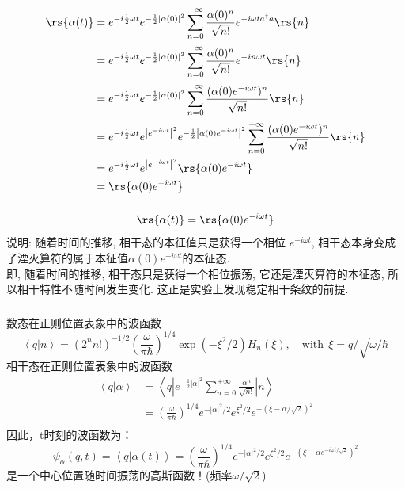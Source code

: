 \begin{frame}
    \frametitle{}
    \[ \begin{aligned}
        \rs{\alpha (t)} &= e^{-i\frac{1}{2} \omega t}  e^{-\frac{1}{2}\left|\alpha(0)\right|^2} \sum_{n=0} ^{+\infty}  \frac{\alpha(0)^n}{\sqrt{n!}} e^{-i \omega t  a^\dagger a}  \rs{n}  \\
        &= e^{-i\frac{1}{2} \omega t}  e^{-\frac{1}{2}\left|\alpha(0)\right|^2}\sum_{n=0} ^{+\infty}  \frac{\alpha(0)^n}{\sqrt{n!}} e^{-i n \omega t }  \rs{n}  \\ 
        &= e^{-i\frac{1}{2} \omega t}  e^{-\frac{1}{2}\left|\alpha(0)\right|^2} \sum_{n=0} ^{+\infty}  \frac{(\alpha(0) e^{-i \omega t })^n}{\sqrt{n!}} \rs{n}  \\ 
        &= e^{-i\frac{1}{2} \omega t} e^{\left|e^{-i \omega t }\right|^2}   e^{-\frac{1}{2}\left|\alpha(0)e^{-i \omega t }\right|^2} \sum_{n=0} ^{+\infty}  \frac{(\alpha(0) e^{-i \omega t })^n}{\sqrt{n!}} \rs{n}  \\ 
        &= e^{-i\frac{1}{2} \omega t}  e^{\left|e^{-i \omega t }\right|^2}  \rs{\alpha(0) e^{-i \omega t} } \\ 
        &= \rs{\alpha(0) e^{-i \omega t}} \\ 
       \end{aligned}\]
\end{frame}

\begin{frame}
      \frametitle{}
      \[ \rs{\alpha (t)}= \rs{\alpha(0) e^{-i \omega t}}  \]
       说明: 随着时间的推移, 相干态的本征值只是获得一个相位 $e^{-i \omega t}$, 相干态本身变成了湮灭算符的属于本征值$ \alpha(0) e^{-i \omega t} $的本征态. \\ {\vspace*{0.6em}} 
       即, 随着时间的推移, 相干态只是获得一个相位振荡, 它还是湮灭算符的本征态, 所以相干特性不随时间发生变化. 这正是实验上发现稳定相干条纹的前提.
\end{frame}

\begin{frame} 
\frametitle{}
     数态在正则位置表象中的波函数
     \[\left\langle q|n \right\rangle = (2^n n!)^{-1/2} ( \frac{\omega}{\pi \hbar})^{1/4} \exp(-\xi^2 /2) H_n (\xi), \quad \text{with}~~ \xi= q/\sqrt{\omega/\hbar}\]
     相干态在正则位置表象中的波函数
     \[\begin{aligned}
         \left\langle q| \alpha \right\rangle & = \left\langle q \left| e^{-\frac{1}{2}\left|\alpha\right|^2}  \sum_{n=0} ^{+\infty}  \frac{\alpha^n}{\sqrt{n!}} \right| n \right\rangle \\
         &=( \frac{\omega}{\pi \hbar})^{1/4} e^{-|\alpha|^2 /2} e^{\xi^2 /2} e^{-(\xi - \alpha/\sqrt{2})^2}  \\
     \end{aligned}\] 
    因此，t时刻的波函数为： 
    \[\psi_\alpha (q,t) = \left\langle q| \alpha(t) \right\rangle = ( \frac{\omega}{\pi \hbar})^{1/4} e^{-|\alpha|^2 /2} e^{\xi^2 /2} e^{-(\xi - \alpha e^{-i \omega t/\sqrt{2}})^2} \]
    是一个中心位置随时间振荡的高斯函数！(频率$\omega/\sqrt{2}$)
\end{frame}

